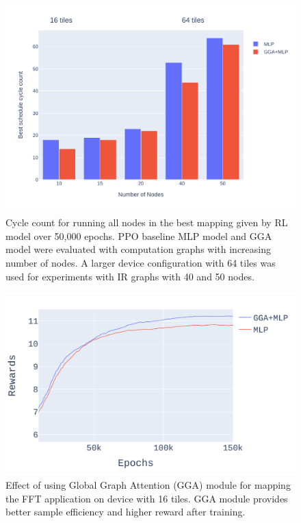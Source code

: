 \begin{figure}[tb]
  \centering
  \includegraphics[width=\linewidth]{fig/nodes_graph.pdf}
  \caption{Cycle count for running all nodes in the best mapping given by RL model over 50,000 epochs. 
  PPO baseline MLP model and GGA model were evaluated with computation graphs with increasing number of nodes. 
  A larger device configuration with 64 tiles was used for experiments with IR graphs with 40 and 50 nodes. }
  \label{fig:nodes_graph}
\end{figure}

\begin{figure}[tb]
  \centering
  \includegraphics[width=\linewidth]{fig/plot_gnn_atten_ppo.pdf}
  \caption{Effect of using Global Graph Attention (GGA) module for mapping the FFT application on device with 16 tiles. 
  GGA module provides better sample efficiency and higher reward after training. }
  \label{fig:ifft_rewards}
\end{figure}

